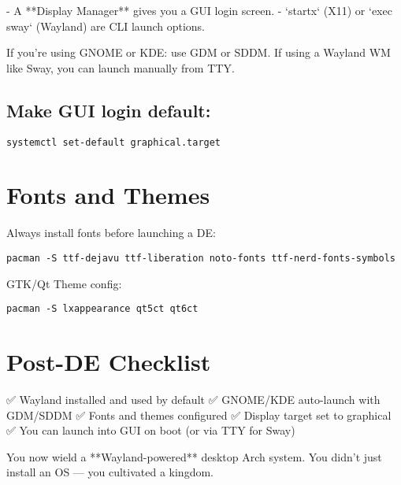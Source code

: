 \documentclass[12pt,openany]{book}
\begin{document}
- A **Display Manager** gives you a GUI login screen.
- `startx` (X11) or `exec sway` (Wayland) are CLI launch options.

If you're using GNOME or KDE: use GDM or SDDM.  
If using a Wayland WM like Sway, you can launch manually from TTY.

\subsection*{Make GUI login default:}

\begin{lstlisting}
systemctl set-default graphical.target
\end{lstlisting}

\section{Fonts and Themes}

Always install fonts before launching a DE:

\begin{lstlisting}
pacman -S ttf-dejavu ttf-liberation noto-fonts ttf-nerd-fonts-symbols
\end{lstlisting}

GTK/Qt Theme config:

\begin{lstlisting}
pacman -S lxappearance qt5ct qt6ct
\end{lstlisting}

\section{Post-DE Checklist}

✅ Wayland installed and used by default  
✅ GNOME/KDE auto-launch with GDM/SDDM  
✅ Fonts and themes configured  
✅ Display target set to graphical  
✅ You can launch into GUI on boot (or via TTY for Sway)

You now wield a **Wayland-powered** desktop Arch system. You didn’t just install an OS — you cultivated a kingdom.

\clearpage
\end{document}
